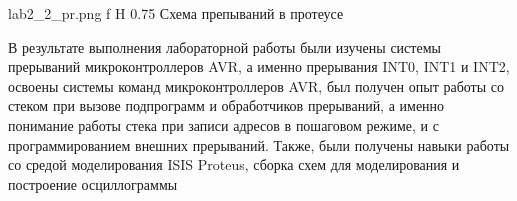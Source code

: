 \documentclass{bmstu}
\makeatletter
\renewcommand\chapter{\par%
\thispagestyle{plain}%
\@afterindentfalse \secdef\@chapter\@schapter}
\makeatother
\begin{document}
    {lab2_2_pr.png} %
    {f} %
    {H} %
    {0.75\textwidth} %
    {Схема препываний в протеусе} %

\chapter{Вывод:}
В результате выполнения лабораторной работы были изучены
системы прерываний микроконтроллеров AVR, а именно прерывания INT0,
INT1 и INT2, освоены системы команд микроконтроллеров AVR, был
получен опыт работы со стеком при вызове подпрограмм и обработчиков
прерываний, а именно понимание работы стека при записи адресов в
пошаговом режиме, и с программированием внешних прерываний. Также,
были получены навыки работы со средой моделирования ISIS Proteus, сборка
схем для моделирования и построение осциллограммы
\end{document}
